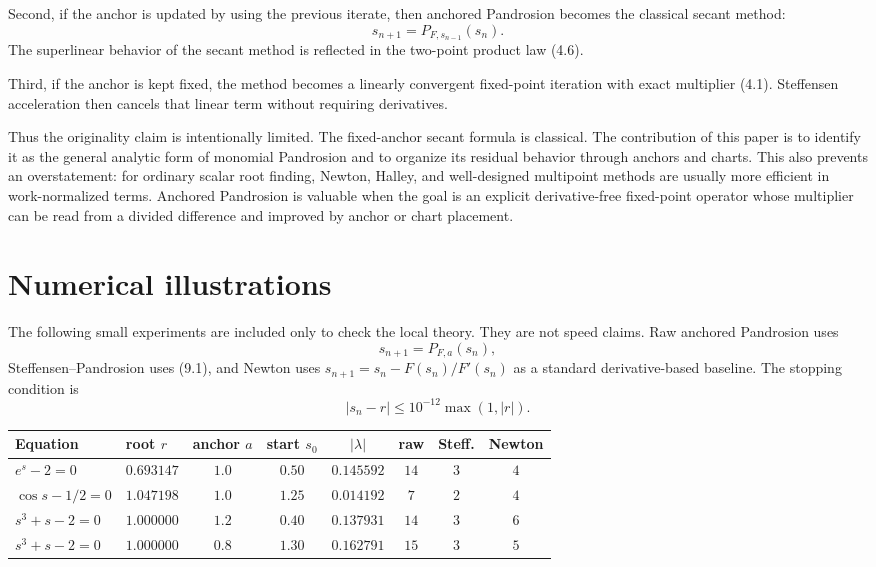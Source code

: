 \documentclass[11pt]{article}
\theoremstyle{definition}
\begin{document}
Second, if the anchor is updated by using the previous iterate, then anchored Pandrosion becomes the classical secant method:
\[
        s_{n+1}=P_{F,s_{n-1}}(s_n).
\]
The superlinear behavior of the secant method is reflected in the two-point product law (4.6).

Third, if the anchor is kept fixed, the method becomes a linearly convergent fixed-point iteration with exact multiplier (4.1).  Steffensen acceleration then cancels that linear term without requiring derivatives.

Thus the originality claim is intentionally limited.  The fixed-anchor secant formula is classical.  The contribution of this paper is to identify it as the general analytic form of monomial Pandrosion and to organize its residual behavior through anchors and charts.  This also prevents an overstatement: for ordinary scalar root finding, Newton, Halley, and well-designed multipoint methods are usually more efficient in work-normalized terms.  Anchored Pandrosion is valuable when the goal is an explicit derivative-free fixed-point operator whose multiplier can be read from a divided difference and improved by anchor or chart placement.

\section{Numerical illustrations}

The following small experiments are included only to check the local theory.  They are not speed claims.  Raw anchored Pandrosion uses
\[
        s_{n+1}=P_{F,a}(s_n),
\]
Steffensen--Pandrosion uses (9.1), and Newton uses $s_{n+1}=s_n-F(s_n)/F'(s_n)$ as a standard derivative-based baseline.  The stopping condition is
\[
        |s_n-r|\le 10^{-12}\max(1,|r|).
\]

\begin{center}
\begin{tabular}{@{}llcccccc@{}}
\toprule
Equation & root $r$ & anchor $a$ & start $s_0$ & $|\lambda|$ & raw & Steff. & Newton \\
\midrule
$e^s-2=0$      & $0.693147$ & $1.0$ & $0.50$ & $0.145592$ & $14$ & $3$ & $4$ \\
$\cos s-1/2=0$ & $1.047198$ & $1.0$ & $1.25$ & $0.014192$ & $7$  & $2$ & $4$ \\
$s^3+s-2=0$   & $1.000000$ & $1.2$ & $0.40$ & $0.137931$ & $14$ & $3$ & $6$ \\
$s^3+s-2=0$   & $1.000000$ & $0.8$ & $1.30$ & $0.162791$ & $15$ & $3$ & $5$ \\
\bottomrule
\end{tabular}
\end{center}
\end{document}

